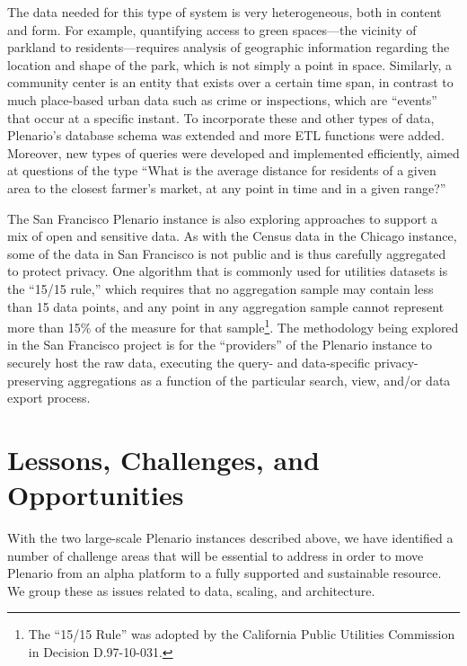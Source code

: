 \documentclass[11pt]{article}
\begin{document}
The data needed for this type of system is very heterogeneous, both in content and form. For example, quantifying access to green spaces---the vicinity of parkland to residents---requires analysis of geographic information regarding the location and shape of the park, which is not simply a point in space. Similarly, a community center is an entity that exists over a certain time span, in contrast to much place-based urban data such as crime or inspections, which are ``events'' that occur at a specific instant. To incorporate these and other types of data, Plenario's database schema was extended and more ETL functions were added. Moreover, new types of queries were developed and implemented efficiently, aimed at questions of the type ``What is the average distance for residents of a given area to the closest farmer's market, at any point in time and in a given range?''

The San Francisco Plenario instance is also exploring approaches to support a mix of open and sensitive data. As with the Census data in the Chicago instance, some of the data in San Francisco is not public and is thus carefully aggregated to protect privacy. One algorithm that is commonly used for utilities datasets is the ``15/15 rule,'' which requires that no aggregation sample may contain less than 15 data points, and any point in any aggregation sample cannot represent more than 15\% of the measure for that sample\footnote{The ``15/15 Rule'' was adopted by the California Public Utilities Commission in Decision D.97-10-031.}. The methodology being explored in the San Francisco project is for the ``providers'' of the Plenario instance to securely host the raw data, executing the query- and data-specific privacy-preserving aggregations as a function of the particular search, view, and/or data export process.




\section{Lessons, Challenges, and Opportunities}\label{sec:challenges}
With the two large-scale Plenario instances described above, we have identified a number of challenge areas that will be essential to address in order to move Plenario from an alpha platform to a fully supported and sustainable resource. We group these as issues related to data, scaling, and architecture. 
\end{document}
